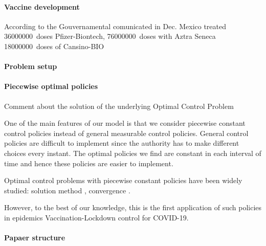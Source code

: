 \paragraph{Vaccine development}
    According to the Gouvernamental comunicated in Dec. Mexico treated
    \SI{36000000}{doses} Pfizer-Biontech, \SI{76000000}{doses} with Aztra
    Seneca  \SI{18000000}{doses} of Cansino-BIO

\paragraph{Problem setup}

\paragraph{Piecewise optimal policies}
    Comment about the solution of the underlying Optimal Control Problem

One of the main features of our model is that we consider piecewise constant
control policies instead of general measurable control policies. General
control policies are difficult to implement since the authority has to make
different choices every instant. The optimal policies we find are constant in
each interval of time and hence these policies are easier to implement.

Optimal control problems with piecewise constant policies have been widely studied:  solution method \cite{MR3228405}, convergence \cite{MR3627992}.

However, to the best of our knowledge, this is the first application of such
policies in epidemics Vaccination-Lockdown control for COVID-19.


\paragraph{Papaer structure}